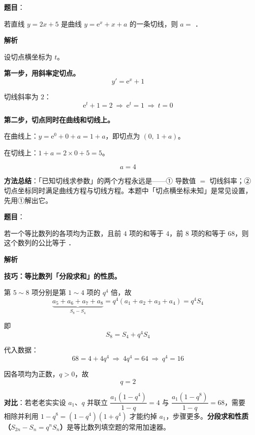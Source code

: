 \begin{answer}

\textbf{题目}：

若直线 $y=2x+5$ 是曲线 $y=\mathrm{e}^{x}+x+a$ 的一条切线，则 $a=$ \gkblank{}．

\textbf{解析}

设切点横坐标为 $t$。

\textbf{第一步，用斜率定切点。}
\nopagebreak[4]
\[y'=\mathrm e^x+1\]

切线斜率为 $2$：
\nopagebreak[4]
\[\mathrm e^t+1=2\ \Longrightarrow\ \mathrm e^t=1\ \Longrightarrow\ t=0\]

\textbf{第二步，切点同时在曲线和切线上。}

在曲线上：$y=\mathrm e^0+0+a=1+a$，即切点为 $(0,\ 1+a)$。

在切线上：$1+a=2\times0+5=5$。

\nopagebreak[4]
\[a=4\]

\begin{gktip}
\textbf{方法总结}：「已知切线求参数」的两个方程永远是——① 导数值 $=$ 切线斜率；② 切点坐标同时满足曲线方程与切线方程。本题中「切点横坐标未知」是常见设置，先用①解出它。
\end{gktip}


\par\medskip

\end{answer}
\begin{answer}

\textbf{题目}：

若一个等比数列的各项均为正数，且前 $4$ 项的和等于 $4$，前 $8$ 项的和等于 $68$，则这个数列的公比等于 \gkblank{}．

\textbf{解析}

\textbf{技巧：等比数列「分段求和」的性质。}

第 $5\sim8$ 项分别是第 $1\sim4$ 项的 $q^4$ 倍，故
\nopagebreak[4]
\[\underbrace{a_5+a_6+a_7+a_8}_{S_8-S_4}=q^4\left(a_1+a_2+a_3+a_4\right)=q^4S_4\]

即
\nopagebreak[4]
\[S_8=S_4+q^4S_4\]

代入数据：
\nopagebreak[4]
\[68=4+4q^4\ \Longrightarrow\ 4q^4=64\ \Longrightarrow\ q^4=16\]

因各项均为正数，$q>0$，故
\nopagebreak[4]
\[q=2\]

\begin{gktip}
\textbf{对比}：若老老实实设 $a_1$、$q$ 并联立 $\dfrac{a_1(1-q^4)}{1-q}=4$ 与 $\dfrac{a_1(1-q^8)}{1-q}=68$，需要相除并利用 $1-q^8=(1-q^4)(1+q^4)$ 才能约掉 $a_1$，步骤更多。\textbf{分段求和性质（$S_{2n}-S_n=q^nS_n$）}是等比数列填空题的常用加速器。
\end{gktip}


\par\medskip

\end{answer}
